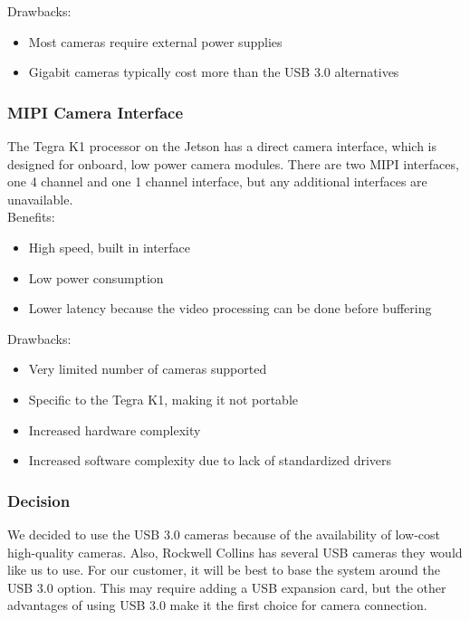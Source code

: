 	Drawbacks:
	\begin{itemize}[leftmargin=2cm,labelindent=2cm]
		\item Most cameras require external power supplies
		\item Gigabit cameras typically cost more than the USB 3.0 alternatives\\
	\end{itemize}
	
	\subsubsection{MIPI Camera Interface}
	The Tegra K1 processor on the Jetson has a direct camera interface, which is designed for onboard, low power camera modules. There are two MIPI interfaces, one 4 channel and one 1 channel interface, but any additional interfaces are unavailable.\\
		
	Benefits:
	\begin{itemize}[leftmargin=2cm,labelindent=2cm]
		\item High speed, built in interface
		\item Low power consumption
		\item Lower latency because the video processing can be done before buffering
	\end{itemize}
	
	Drawbacks:
	\begin{itemize}[leftmargin=2cm,labelindent=2cm]
		\item Very limited number of cameras supported
		\item Specific to the Tegra K1, making it not portable
		\item Increased hardware complexity
		\item Increased software complexity due to lack of standardized drivers\\
	\end{itemize}
	
	\subsubsection{\textbf{Decision}}
	We decided to use the USB 3.0 cameras because of the availability of low-cost high-quality cameras. Also, Rockwell Collins has several USB cameras they would like us to use. For our customer, it will be best to base the system around the USB 3.0 option. This may require adding a USB expansion card, but the other advantages of using USB 3.0 make it the first choice for camera connection.
	
